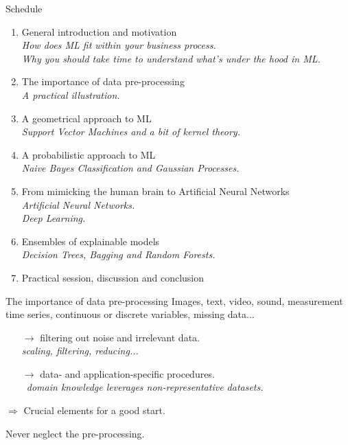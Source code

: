 \documentclass{beamer}
\begin{document}
\begin{frame}{Schedule}
\begin{enumerate}
\item General introduction and motivation \Checkmark \\
{\small \it How does ML fit within your business process.\\
Why you should take time to understand what's under the hood in ML.}
\item The importance of data pre-processing\\
{\small \it A practical illustration.}
\item A geometrical approach to ML\\
{\small \it Support Vector Machines and a bit of kernel theory.}
\item A probabilistic approach to ML\\
{\small \it Naive Bayes Classification and Gaussian Processes.}
\item From mimicking the human brain to Artificial Neural Networks\\
{\small \it Artificial Neural Networks.\\
Deep Learning.}
\item Ensembles of explainable models\\
{\small \it Decision Trees, Bagging and Random Forests.}
\item Practical session, discussion and conclusion
\end{enumerate}
\end{frame}

\begin{frame}{The importance of data pre-processing}
Images, text, video, sound, measurement time series, continuous or discrete variables, missing data...
\begin{itemize}
\item[$\rightarrow$] filtering out noise and irrelevant data.\\
{\small \it scaling, filtering, reducing...}
\item[$\rightarrow$] data- and application-specific procedures.\\
{\small \it domain knowledge leverages non-representative datasets.}
\end{itemize}
$\Rightarrow$ Crucial elements for a good start.
\begin{center}
Never neglect the pre-processing.
\end{center}
\end{frame}
\end{document}
